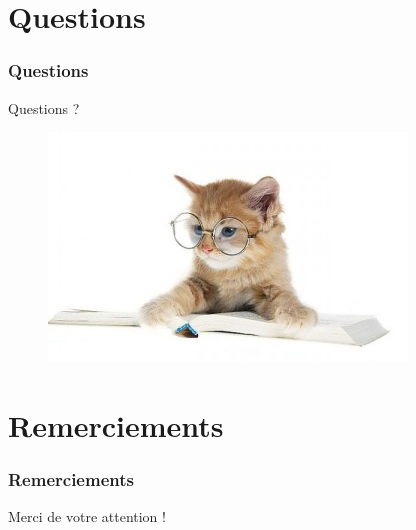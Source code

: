 \documentclass{beamer}
\begin{document}
\section*{Questions}
\begin{frame}
\frametitle{Questions}
 \begin{minipage}{0.4\textwidth}
  \begin{center}
    Questions ?
  \end{center}
 \end{minipage}
 \begin{minipage}{0.4\textwidth}
   \begin{figure}[h!]
     \centering
     \includegraphics[scale=0.37]{presentation/questionmark_cat.jpg}
   \end{figure}
 \end{minipage}
\end{frame}

\section*{Remerciements}
\begin{frame}
 \frametitle{Remerciements}
 Merci de votre attention !
\end{frame}
\end{document}

